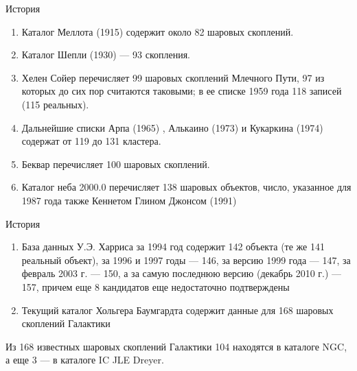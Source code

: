 \documentclass{beamer}
\begin{document}
    \begin{frame}{История}
        \begin{enumerate}[]
            \item Каталог Меллота (1915)\cite{Mellot1915} содержит около 82 шаровых скоплений.
            \item Каталог Шепли (1930)\cite{Shapley1930} --- 93 скопления.
            \item Хелен Сойер\cite{Hogg1947} перечисляет 99 шаровых скоплений Млечного Пути, 97 из которых до сих пор считаются таковыми; в ее списке 1959 года\cite{Hogg1959} 118 записей (115 реальных).
            \item Дальнейшие списки Арпа (1965) , Алькаино (1973) и Кукаркина (1974) содержат от 119 до 131 кластера.
            \item Беквар перечисляет 100 шаровых скоплений.
            \item Каталог неба 2000.0 перечисляет 138 шаровых объектов, число, указанное для 1987 года также Кеннетом Глином Джонсом (1991)
        \end{enumerate}
    \end{frame}
    \begin{frame}{История}
        \begin{enumerate}[]
            \item База данных У.Э. Харриса за 1994 год содержит 142 объекта (те же 141 реальный объект), за 1996 и 1997 годы — 146, за версию 1999 года — 147, за февраль 2003 г. — 150, а за самую последнюю версию (декабрь 2010 г.) — 157, причем еще 8 кандидатов еще недостаточно подтверждены
            \item Текущий каталог Хольгера Баумгардта содержит данные для 168 шаровых скоплений Галактики \cite{Baumgardt2023}
        \end{enumerate}
        Из 168 известных шаровых скоплений Галактики 104 находятся в каталоге NGC, а еще 3 — в каталоге IC JLE Dreyer.
    \end{frame}
\end{document}
